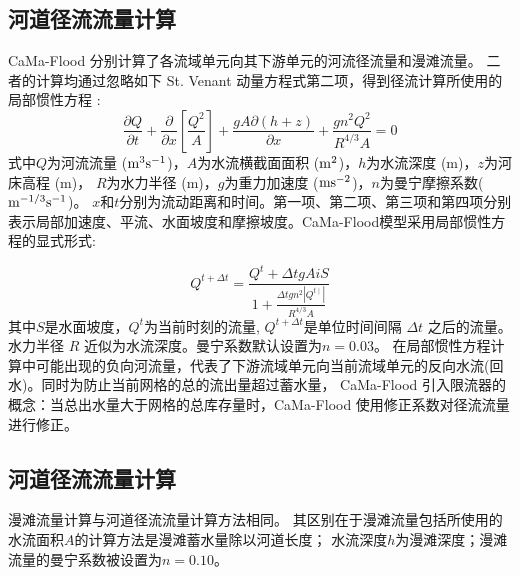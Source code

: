 \subsection{河道径流流量计算}
CaMa-Flood 分别计算了各流域单元向其下游单元的河流径流量和漫滩流量。
二者的计算均通过忽略如下 St. Venant 动量方程式第二项，得到径流计算所使用的局部惯性方程 \cite{bates2010}:
\begin{equation}
\frac{\partial Q}{\partial t}+\frac{\partial}{\partial x}\left[\frac{Q^{2}}{A}\right]+\frac{g A \partial(h+z)}{\partial x}+\frac{g n^{2} Q^{2}}{R^{4 / 3} A}=0
\end{equation}
式中$Q$为河流流量 ($\rm m^3s^{-1}$)，$A$为水流横截面面积 ($\rm m^2$)，$h$为水流深度 (m)，$z$为河床高程 (m)，
$R$为水力半径 (m)，$g$为重力加速度 ($\rm m s^{-2}$)，$n$为曼宁摩擦系数($\rm m^{-1/3} s^{-1}$)。
$x$和$t$分别为流动距离和时间。第一项、第二项、第三项和第四项分别表示局部加速度、平流、水面坡度和摩擦坡度。CaMa-Flood模型采用局部惯性方程的显式形式: 

\begin{equation}
Q^{t+\Delta t}=\frac{Q^{t}+\Delta t g A i S}{1+\frac{\Delta t g n^{2}\left|Q^{t \mid}\right|}{R^{4 / 3} A}}
\end{equation}
其中$S$是水面坡度，$Q^t$为当前时刻的流量, $Q^{t+\Delta t}$是单位时间间隔 $\Delta t$ 之后的流量。水力半径 $R$ 近似为水流深度。曼宁系数默认设置为$n=0.03$。
在局部惯性方程计算中可能出现的负向河流量，代表了下游流域单元向当前流域单元的反向水流(回水)。同时为防止当前网格的总的流出量超过蓄水量，
CaMa-Flood 引入限流器的概念：当总出水量大于网格的总库存量时，CaMa-Flood 使用修正系数对径流流量进行修正。


\subsection{河道径流流量计算}
漫滩流量计算与河道径流流量计算方法相同。
其区别在于漫滩流量包括所使用的水流面积$A$的计算方法是漫滩蓄水量除以河道长度；
水流深度$h$为漫滩深度；漫滩流量的曼宁系数被设置为$n=0.10$。

